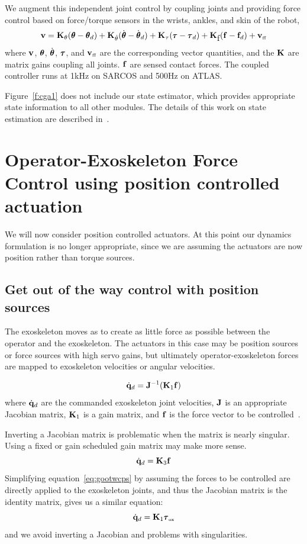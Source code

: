 \documentclass[letterpaper,12pt,fullpage]{article}
\newcommand{\ff}{{\mbox {\tiny ff}}}
\newcommand{\ox}{{\mbox {\tiny ox}}}
\begin{document}
We augment this independent joint control by coupling joints
and providing force control based on force/torque sensors in the wrists,
ankles, and skin of the robot,
\begin{equation}
\vv = \mK_{\theta} ( \vtheta - \vtheta_{d} )
+ \mK_{\dot{\theta}} ( \dot{\vtheta} - \dot{\vtheta}_{d} )
+ \mK_{\tau} ( \vtau - \vtau_{d} )
+ \mK_{\mbox{f}} ( \vf - \vf_{d} ) 
+ \vv_{\ff}
\end{equation}
where ${\bf v}$, $\vtheta$, $\dot{\vtheta}$, $\vtau$, and $\vv_{\ff}$
are the corresponding vector quantities, and the ${\bf K}$ are matrix gains
coupling all joints. ${\bf f}$ are sensed contact forces.
The coupled controller runs at 1kHz on SARCOS and 500Hz on ATLAS.

Figure~\ref{f:cga1} does not include our state estimator, which provides
appropriate state information to all other modules. The details of this work on state estimation are
described in~\cite{xinji_com_est,Xinjilefu-thesis}.

\section{Operator-Exoskeleton Force Control using position controlled actuation}

We will now consider position controlled actuators.
At this point our dynamics formulation is no longer appropriate, since we
are assuming the actuators are now position rather than torque sources.

\subsection{Get out of the way control with position sources}

The exoskeleton moves as to create as little force as possible between the
operator and the exoskeleton. The actuators in this case may be position sources or
force sources with high servo gains,
but ultimately operator-exoskeleton forces are mapped
to exoskeleton velocities or angular velocities.

\begin{equation}
\dot{{\bf q}}_d = {\bf J}^{-1} ({\bf K}_1 {\bf f})
\label{eq:gootwcps}
\end{equation}
where $\dot{{\bf q}}_d$ are the commanded exoskeleton joint velocities,
${\bf J}$ is an appropriate Jacobian matrix, ${\bf K}_1$ is a gain matrix,
and ${\bf f}$ is the force vector to be controlled~\cite{IEEE06990981}.

Inverting a Jacobian matrix is problematic when the matrix is
nearly singular.
Using a fixed or gain scheduled gain matrix may make more sense.
\begin{equation}
\dot{{\bf q}}_d = {\bf K}_3 {\bf f}
\end{equation}
Simplifying equation~\ref{eq:gootwcps}
by assuming the forces to be controlled
are directly applied to the exoskeleton joints, and thus the Jacobian matrix
is the identity matrix, gives us a similar equation:
\begin{equation}
\dot{\vq}_d = \mK_1 \vtau_{\ox}
\end{equation}
and we avoid inverting a Jacobian and problems with singularities.
\end{document}
